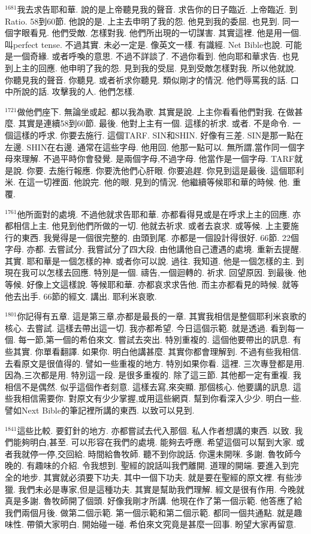 \documentclass{book}
\begin{document}
$^{1681}$我去求告耶和華.
說的是上帝聽見我的聲音.
求告你的日子臨近.
上帝臨近.
到Ratio.
58到60節.
他說的是.
上主去申明了我的怨.
他見到我的委屈.
也見到.
同一個字眼看見.
他們受敵.
怎樣對我.
他們所出現的一切謀害.
其實這裡.
他是用一個.
叫perfect tense.
不過其實.
未必一定是.
像英文一樣.
有識經.
Net Bible也說.
可能是一個奇緣.
或者呼喚的意思.
不過不詳談了.
不過你看到.
他向耶和華求告.
也見到上主的回應.
他申明了我的怨.
見到我的受屈.
見到受敵怎樣對我.
所以他就說.
你聽見我的聲音.
你聽見.
或者祈求你聽見.
類似剛才的情況.
他們辱罵我的話.
口中所說的話.
攻擊我的人.
他們怎樣.

$^{1721}$做他們座下.
無論坐或起.
都以我為歌.
其實是說.
上主你看看他們對我.
在做甚麼.
其實是連續58到60節.
最後.
他對上主有一個.
這樣的祈求.
或者.
不是命令.
一個這樣的呼求.
你要去施行.
這個TARF.
SIN和SHIN.
好像有三差.
SIN是那一點在左邊.
SHIN在右邊.
通常在這些字母.
他用回.
他那一點可以.
無所謂,當作同一個字母來理解.
不過平時你會發覺.
是兩個字母,不過字母.
他當作是一個字母.
TARF就是說.
你要.
去施行報應.
你要洗他們心肝眼.
你要追趕.
你見到這是最後.
這個耶利米.
在這一切裡面.
他說完.
他的眼.
見到的情況.
他繼續等候耶和華的時候.
他.
重覆.

$^{1761}$他所面對的處境.
不過他就求告耶和華.
亦都看得見或是在呼求上主的回應.
亦都相信上主.
他見到他們所做的一切.
他就去祈求.
或者去哀求.
或等候.
上主要施行的東西.
我覺得是一個很完整的.
由頭到尾.
亦都是一個設計得很好.
66節.
22個字母.
亦都.
去嘗試分.
我嘗試分了四大段.
由他講他自己遭遇的處境.
重新去提醒.
其實.
耶和華是一個怎樣的神.
或者你可以說.
過往.
我知道.
他是一個怎樣的主.
到現在我可以怎樣去回應.
特別是一個.
禱告,一個迴轉的.
祈求.
回望原因.
到最後.
他等候.
好像上文這樣說.
等候耶和華.
亦都哀求求告他.
而主亦都看見的時候.
就等他去出手.
66節的經文.
講出.
耶利米哀歌.

$^{1801}$你記得有五章.
這是第三章,亦都是最長的一章.
其實我相信是整個耶利米哀歌的核心.
去嘗試.
這樣去帶出這一切.
我亦都希望.
今日這個示範.
就是透過.
看到每一個.
每一節,第一個的希伯來文.
嘗試去突出.
特別重複的.
這個他要帶出的訊息.
有些其實.
你單看翻譯.
如果你.
明白他講甚麼.
其實你都會理解到.
不過有些我相信.
去看原文是很值得的.
譬如一些重複的地方.
特別如果你看.
這裡.
三次專登都是用.
因為,三次都是用.
特別這一段.
是很多重複的.
除了這三節.
其他都一定有重複.
我相信不是偶然.
似乎這個作者刻意.
這樣去寫,來突顯.
那個核心.
他要講的訊息.
這些我相信需要你.
對原文有少少掌握,或用這些網頁.
幫到你看深入少少.
明白一些.
譬如Next Bible的筆記裡所講的東西.
以致可以見到.

$^{1841}$這些比較.
要釘針的地方.
亦都嘗試去代入那個.
私人作者想講的東西.
以致.
我們能夠明白,甚至.
可以形容在我們的處境.
能夠去呼應.
希望這個可以幫到大家.
或者我就停一停,交回給.
時間給魯牧師.
聽不到你說話.
你還未開咪.
多謝.
魯牧師今晚的.
有趣味的介紹.
令我想到.
聖經的說話叫我們離開.
道理的開端.
要進入到完全的地步.
其實就必須要下功夫.
其中一個下功夫.
就是要在聖經的原文裡.
有些涉獵.
我們未必是專家,但是這種功夫.
其實是幫助我們理解.
經文是很有作用.
今晚就真是多謝.
魯牧師開了個頭.
好像我剛才所講.
他現在作了第一個示範.
他答應了給我們兩個月後.
做第二個示範.
第一個示範和第二個示範.
都同一個共通點.
就是趣味性.
帶領大家明白.
開始碰一碰.
希伯來文究竟是甚麼一回事.
盼望大家再留意.
\end{document}
